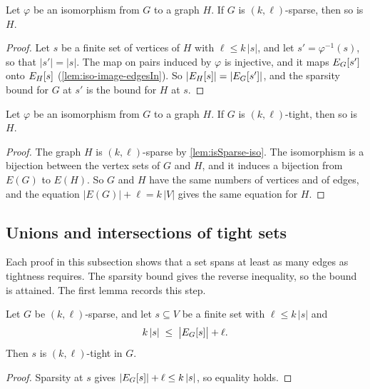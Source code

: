 \begin{lemma}
  \label{lem:isSparse-iso}
  \leanok
  Let $\varphi$ be an isomorphism from $G$ to a graph $H$. If $G$ is
  $(k,\ell)$-sparse, then so is $H$.
\end{lemma}
\begin{proof}
  \leanok
  Let $s$ be a finite set of vertices of $H$ with $\ell \le k\,|s|$, and
  let $s' = \varphi^{-1}(s)$, so that $|s'| = |s|$. The map on pairs
  induced by $\varphi$ is injective, and it maps $\edgesIn[G]{s'}$ onto
  $\edgesIn[H]{s}$ (\cref{lem:iso-image-edgesIn}). So
  $|\edgesIn[H]{s}| = |\edgesIn[G]{s'}|$, and the sparsity bound for
  $G$ at $s'$ is the bound for $H$ at $s$.
\end{proof}

\begin{lemma}
  \label{lem:isTight-iso}
  \leanok
  Let $\varphi$ be an isomorphism from $G$ to a graph $H$. If $G$ is
  $(k,\ell)$-tight, then so is $H$.
\end{lemma}
\begin{proof}
  \leanok
  The graph $H$ is $(k,\ell)$-sparse by \cref{lem:isSparse-iso}. The
  isomorphism is a bijection between the vertex sets of $G$ and $H$, and
  it induces a bijection from $E(G)$ to $E(H)$. So $G$ and $H$ have the
  same numbers of vertices and of edges, and the equation
  $|E(G)| + \ell = k\,|V|$ gives the same equation for $H$.
\end{proof}

\subsection{Unions and intersections of tight sets}

Each proof in this subsection shows that a set spans at least as many
edges as tightness requires. The sparsity bound gives the reverse
inequality, so the bound is attained. The first lemma records this
step.

\begin{lemma}
  \label{lem:isSparse-isTightOn-of-le}
  \leanok
  Let $G$ be $(k,\ell)$-sparse, and let $s \subseteq V$ be a finite set
  with $\ell \le k\,|s|$ and
  \[
    k\,|s| \;\le\; \bigl|\edgesIn{s}\bigr| + \ell.
  \]
  Then $s$ is $(k,\ell)$-tight in $G$.
\end{lemma}
\begin{proof}
  \leanok
  Sparsity at $s$ gives $|\edgesIn{s}| + \ell \le k\,|s|$, so equality
  holds.
\end{proof}


